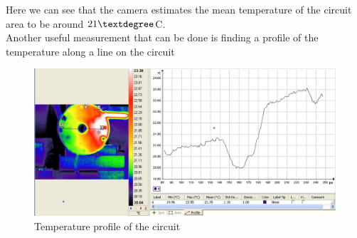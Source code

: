 \documentclass[english]{article}
\begin{document}
Here we can see that the camera estimates the mean temperature of the circuit area to be around $21 \textdegree$C.\\
Another useful measurement that can be done is finding a profile of the temperature along a line on the circuit\\
\begin{figure}[H]
	\centering
	\includegraphics[width=1\linewidth]{Pictures/profile.jpg}
	\caption{Temperature profile of the circuit}
	\label{fig}
\end{figure}
\end{document}
